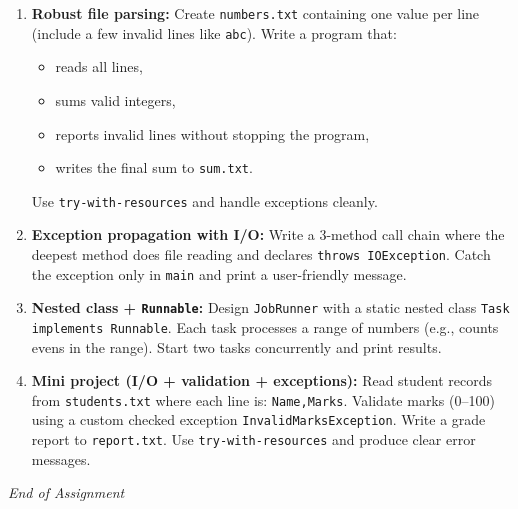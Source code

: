 \documentclass[11pt,a4paper]{article}
\begin{document}
\begin{enumerate}[label=H\arabic*., leftmargin=*]
  \item \textbf{Robust file parsing:} Create \texttt{numbers.txt} containing one value per line (include a few invalid lines like \texttt{abc}).
    Write a program that:
    \begin{itemize}[leftmargin=*]
      \item reads all lines,
      \item sums valid integers,
      \item reports invalid lines without stopping the program,
      \item writes the final sum to \texttt{sum.txt}.
    \end{itemize}
    Use \texttt{try-with-resources} and handle exceptions cleanly.

  \item \textbf{Exception propagation with I/O:} Write a 3-method call chain where the deepest method does file reading and
    declares \texttt{throws IOException}. Catch the exception only in \texttt{main} and print a user-friendly message.

  \item \textbf{Nested class + \texttt{Runnable}:} Design \texttt{JobRunner} with a static nested class \texttt{Task implements Runnable}.
    Each task processes a range of numbers (e.g., counts evens in the range). Start two tasks concurrently and print results.

  \item \textbf{Mini project (I/O + validation + exceptions):} Read student records from \texttt{students.txt} where each line is:
    \texttt{Name,Marks}. Validate marks (0--100) using a custom checked exception \texttt{InvalidMarksException}.
    Write a grade report to \texttt{report.txt}. Use \texttt{try-with-resources} and produce clear error messages.
\end{enumerate}

\vfill
\noindent\textit{End of Assignment}
\end{document}
